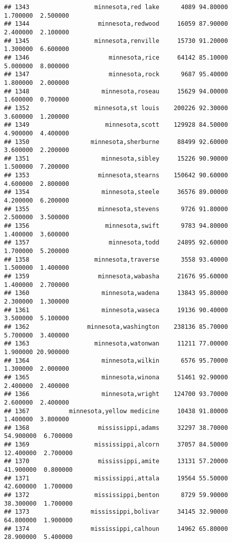 \documentclass[
]{article}
\begin{document}
\begin{verbatim}
## 1343                  minnesota,red lake      4089 94.80000  1.700000  2.500000
## 1344                   minnesota,redwood     16059 87.90000  2.400000  2.100000
## 1345                  minnesota,renville     15730 91.20000  1.300000  6.600000
## 1346                      minnesota,rice     64142 85.10000  5.000000  8.000000
## 1347                      minnesota,rock      9687 95.40000  1.800000  2.000000
## 1348                    minnesota,roseau     15629 94.00000  1.600000  0.700000
## 1352                  minnesota,st louis    200226 92.30000  3.600000  1.200000
## 1349                     minnesota,scott    129928 84.50000  4.900000  4.400000
## 1350                 minnesota,sherburne     88499 92.60000  3.600000  2.200000
## 1351                    minnesota,sibley     15226 90.90000  1.500000  7.200000
## 1353                   minnesota,stearns    150642 90.60000  4.600000  2.800000
## 1354                    minnesota,steele     36576 89.00000  4.200000  6.200000
## 1355                   minnesota,stevens      9726 91.80000  2.500000  3.500000
## 1356                     minnesota,swift      9783 94.80000  1.400000  3.600000
## 1357                      minnesota,todd     24895 92.60000  1.700000  5.200000
## 1358                  minnesota,traverse      3558 93.40000  1.500000  1.400000
## 1359                   minnesota,wabasha     21676 95.60000  1.400000  2.700000
## 1360                    minnesota,wadena     13843 95.80000  2.300000  1.300000
## 1361                    minnesota,waseca     19136 90.40000  3.500000  5.100000
## 1362                minnesota,washington    238136 85.70000  5.700000  3.400000
## 1363                  minnesota,watonwan     11211 77.00000  1.900000 20.900000
## 1364                    minnesota,wilkin      6576 95.70000  1.300000  2.000000
## 1365                    minnesota,winona     51461 92.90000  2.400000  2.400000
## 1366                    minnesota,wright    124700 93.70000  2.600000  2.400000
## 1367           minnesota,yellow medicine     10438 91.80000  1.400000  3.800000
## 1368                   mississippi,adams     32297 38.70000 54.900000  6.700000
## 1369                  mississippi,alcorn     37057 84.50000 12.400000  2.700000
## 1370                   mississippi,amite     13131 57.20000 41.900000  0.800000
## 1371                  mississippi,attala     19564 55.50000 42.600000  1.700000
## 1372                  mississippi,benton      8729 59.90000 38.300000  1.700000
## 1373                 mississippi,bolivar     34145 32.90000 64.800000  1.900000
## 1374                 mississippi,calhoun     14962 65.80000 28.900000  5.400000

\end{verbatim}
\end{document}
